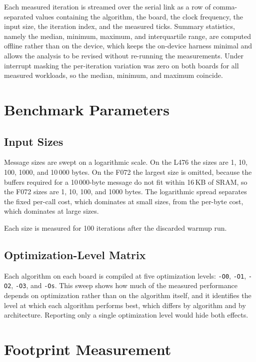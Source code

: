 Each measured iteration is streamed over the serial link as a row of
comma-separated values containing the algorithm, the board, the clock frequency,
the input size, the iteration index, and the measured ticks.
Summary statistics, namely the median, minimum, maximum, and interquartile
range, are computed offline rather than on the device, which keeps the on-device
harness minimal and allows the analysis to be revised without re-running the
measurements.
Under interrupt masking the per-iteration variation was zero on both boards for
all measured workloads, so the median, minimum, and maximum coincide.

\section{Benchmark Parameters}

\subsection{Input Sizes}

Message sizes are swept on a logarithmic scale.
On the L476 the sizes are 1, 10, 100, 1000, and 10\,000 bytes.
On the F072 the largest size is omitted, because the buffers required for a
10\,000-byte message do not fit within 16\,KB of SRAM, so the F072 sizes are
1, 10, 100, and 1000 bytes.
The logarithmic spread separates the fixed per-call cost, which dominates at
small sizes, from the per-byte cost, which dominates at large sizes.

Each size is measured for 100 iterations after the discarded warmup run.

\subsection{Optimization-Level Matrix}

Each algorithm on each board is compiled at five optimization levels:
\texttt{-O0}, \texttt{-O1}, \texttt{-O2}, \texttt{-O3}, and \texttt{-Os}.
This sweep shows how much of the measured performance depends on optimization
rather than on the algorithm itself, and it identifies the level at which each
algorithm performs best, which differs by algorithm and by architecture.
Reporting only a single optimization level would hide both effects.

\section{Footprint Measurement}

